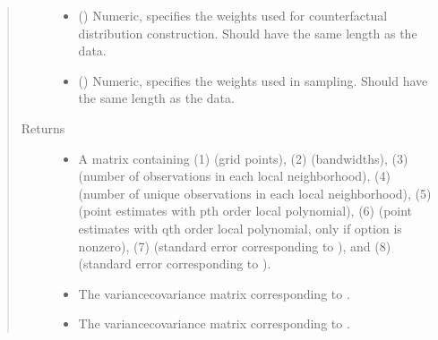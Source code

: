 \documentclass[letterpaper,10pt,english]{sphinxmanual}
\begin{document}
\begin{fulllineitems}
\begin{quote}
\begin{description}
\begin{itemize}
\item {} 
\sphinxAtStartPar
{} () \textendash{} Numeric, specifies the weights used for counterfactual distribution construction. Should have the same length as the data.

\item {} 
\sphinxAtStartPar
{} () \textendash{} Numeric, specifies the weights used in sampling. Should have the same length as the data.

\end{itemize}

\item[{Returns}] \leavevmode
\sphinxAtStartPar
\begin{itemize}
\item {} 
\sphinxAtStartPar
{} \textendash{} A matrix containing (1)  (grid points), (2)  (bandwidths), (3)  (number of observations in each local neighborhood), (4)  (number of unique observations in each local neighborhood), (5)  (point estimates with p\sphinxhyphen{}th order local polynomial), (6)  (point estimates with q\sphinxhyphen{}th order local polynomial, only if option  is nonzero), (7)  (standard error corresponding to ), and (8)  (standard error corresponding to ).

\item {} 
\sphinxAtStartPar
{} \textendash{} The variance\sphinxhyphen{}covariance matrix corresponding to .

\item {} 
\sphinxAtStartPar
{} \textendash{} The variance\sphinxhyphen{}covariance matrix corresponding to .

\end{itemize}


\end{description}\end{quote}

\end{fulllineitems}
\end{document}
